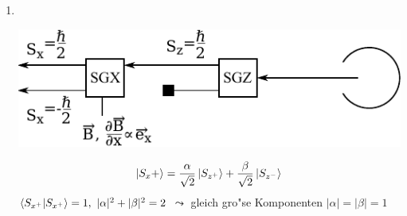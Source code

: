 \documentclass[a4paper]{scrartcl}
\newenvironment{aaufz}
	{\renewcommand{\labelenumi}{\alph{enumi})}
   \renewcommand{\labelenumii}{\alph{enumii})}
   \begin{enumerate}}
  {\end{enumerate}}
\begin{document}
{\begin{aaufz}
Spin-Operator:
\begin{align}
\begin{split}
S_z \ket{ S_{z^+}} & = \frac \hbar 2 \ket{ S_{z^+}} \\
S_z \ket{S_{z^-}} & = - \frac \hbar 2 \ket{S_{z^-}}
\end{split}
\end{align}
Erwartungswert und Unsch"arfe:
\begin{align}
\braket{ S_z }& = \braket{ S_{z^+} | S_z | S_{z^+}} = \frac \hbar 2 \\
(\Delta S_z)^2 & = \braket { S_{z^+}  | S_z^2 - \frac {\hbar^2}4 | S_{z^+}} = 0 \notag
\end{align}
\item \
\begin{center}
\includegraphics{059SGXSGZ}
\end{center}
$$\ket {S_x+} = \frac \alpha {\sqrt2} \ket{S_{z^+}} + \frac \beta {\sqrt2} \ket{S_{z^-}}$$
$\braket{ S_{x^+} | S_{x^+}} = 1, \ \vert \alpha \vert ^2 + \vert \beta \vert ^2 = 2$ $\leadsto$ gleich gro"se Komponenten $\vert \alpha \vert = \vert \beta \vert = 1$


\end{aaufz}}
\end{document}
